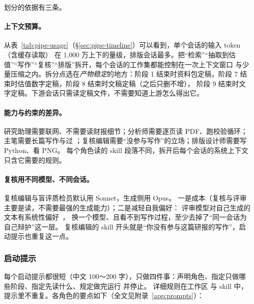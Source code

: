 划分的依据有三条。

\paragraph{上下文预算。}从表~\ref{tab:pipe-usage}（\S\ref{sec:pipe-timeline}）可以看到，单个会话的输入 token（含缓存读取）
在 1,000 万上下的量级，排版会话最多。把“检索”“抽取到估值”“写作”“复核”“排版”拆开，每个会话的工作集都能控制在一次上下文窗口
与少量压缩之内。拆分点选在\emph{产物稳定}的地方：阶段 1 结束时资料包定稿，阶段 7 结束时估值数字定稿，阶段 8 结束时文稿定稿（之后只删不增），
阶段 9 结束时文字定稿。下游会话只需读定稿文件，不需要知道上游怎么得出它。

\paragraph{能力与约束的差异。}研究助理需要联网、不需要读财报细节；分析师需要逐页读 PDF、跑校验循环；
主笔需要长篇写作与过 ；复核编辑需要“没参与写作”的立场；排版设计师需要写 Python、看 PNG。
每个角色读的 skill 段落不同，拆开后每个会话的系统上下文只含它需要的规则。

\paragraph{复核用不同模型、不同会话。}复核编辑与盲评质检员默认用 Sonnet，生成侧用 Opus。
一是成本（复核与评审主要是读，不需要最强的生成能力）；二是减轻自我偏好：
评审模型对自己生成的文本有系统性偏好~\citep{panickssery2024self,zheng2023judging}，
换一个模型、且看不到写作过程，至少去掉了“同一会话为自己辩护”这一层。
复核编辑的 skill 开头就是“你没有参与这篇研报的写作”，启动提示也重复这一点。

\subsubsection{启动提示}

每个启动提示都很短（中文 100～200 字），只做四件事：声明角色、指定只做哪些阶段、指定先读什么、规定做完运行  并停止。
详细规则在工作区  与 skill 中，提示里不重复。各角色的要点如下（全文见附录~\ref{app:prompts}）：

